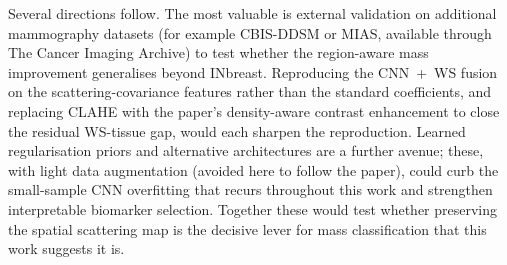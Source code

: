 Several directions follow. The most valuable is external validation on additional mammography datasets (for example CBIS-DDSM or MIAS, available through The Cancer Imaging Archive) to test whether the region-aware mass improvement generalises beyond INbreast. Reproducing the CNN~+~WS fusion on the scattering-covariance features rather than the standard coefficients, and replacing CLAHE with the paper's density-aware contrast enhancement to close the residual WS-tissue gap, would each sharpen the reproduction. Learned regularisation priors and alternative architectures are a further avenue; these, with light data augmentation (avoided here to follow the paper), could curb the small-sample CNN overfitting that recurs throughout this work and strengthen interpretable biomarker selection. Together these would test whether preserving the spatial scattering map is the decisive lever for mass classification that this work suggests it is.



